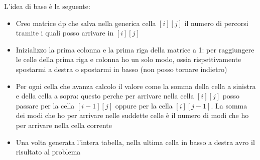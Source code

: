 L'idea di base è la seguente:
\begin{itemize}
	\item Creo matrice {\ttfamily dp} che salva nella generica cella $ \left[i\right]\left[j\right] $ il numero di percorsi tramite i quali posso arrivare in $ \left[i\right]\left[j\right] $
	\item Inizializzo la prima colonna e la prima riga della matrice a 1: per raggiungere le celle della prima riga e colonna ho un solo modo, ossia rispettivamente spostarmi a destra o spostarmi in basso (non posso tornare indietro)
	\item Per ogni cella che avanza calcolo il valore come la somma della cella a sinistra e della cella a sopra: questo perche per arrivare nella cella $ \left[i\right]\left[j\right] $ posso passare per la cella $ \left[i-1\right]\left[j\right] $ oppure per la cella $ \left[i\right]\left[j-1\right] $. La somma dei modi che ho per arrivare nelle suddette celle è il numero di modi che ho per arrivare nella cella corrente
	\item Una volta generata l'intera tabella, nella ultima cella in basso a destra avro il risultato al problema
\end{itemize}
